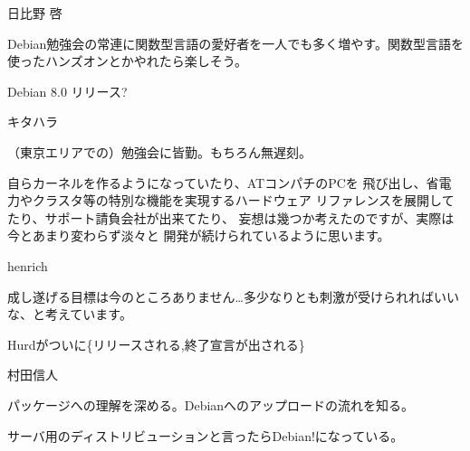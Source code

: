 \begin{prework}{ 日比野 啓 }



 Debian勉強会の常連に関数型言語の愛好者を一人でも多く増やす。関数型言語を使ったハンズオンとかやれたら楽しそう。


 Debian 8.0 リリース?

\end{prework}

\begin{prework}{ キタハラ }


（東京エリアでの）勉強会に皆勤。もちろん無遅刻。


自らカーネルを作るようになっていたり、ATコンパチのPCを
飛び出し、省電力やクラスタ等の特別な機能を実現するハードウェア
リファレンスを展開してたり、サポート請負会社が出来てたり、
妄想は幾つか考えたのですが、実際は今とあまり変わらず淡々と
開発が続けられているように思います。

\end{prework}

\begin{prework}{ henrich }


成し遂げる目標は今のところありません…多少なりとも刺激が受けられればいい
 な、と考えています。


Hurdがついに\{リリースされる,終了宣言が出される\}

\end{prework}

\begin{prework}{ 村田信人 }


 パッケージへの理解を深める。Debianへのアップロードの流れを知る。


 サーバ用のディストリビューションと言ったらDebian!になっている。

\end{prework}



